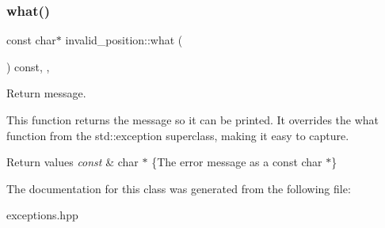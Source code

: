 \subsubsection{\texorpdfstring{what()}{what()}}
{\footnotesize\ttfamily const char$\ast$ invalid\+\_\+position\+::what (\begin{DoxyParamCaption}{ }\end{DoxyParamCaption}) const\hspace{0.3cm}{\ttfamily [inline]}, {\ttfamily [override]}, {\ttfamily [noexcept]}}



Return message. 

This function returns the message so it can be printed. It overrides the what function from the std\+::exception superclass, making it easy to capture.


\begin{DoxyRetVals}{Return values}
{\em const} & char $\ast$ \{The error message as a const char $\ast$\} \\
\hline
\end{DoxyRetVals}


The documentation for this class was generated from the following file\+:\begin{DoxyCompactItemize}
\item 
exceptions.\+hpp\end{DoxyCompactItemize}
